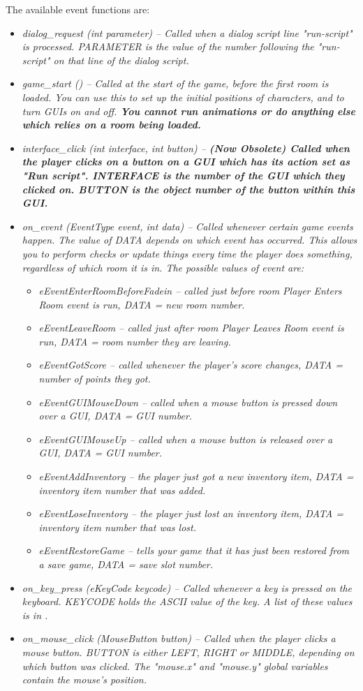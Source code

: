 The available event functions are:
\begin{itemize}
\item \it{dialog_request (int parameter)} -- Called when a dialog script line
  "run-script" is processed. PARAMETER is
  the value of the number following the "run-script" on that line of the
  dialog script.
\item \it{game_start ()} -- Called at the start of the game, before the first
  room is loaded. You can
  use this to set up the initial positions of characters, and to turn
  GUIs on and off. \bf{You cannot run animations or do anything else
  which relies on a room being loaded}.
\item \it{interface_click (int interface, int button)} -- \bf{(Now Obsolete)}
  Called when the player clicks on a button on a GUI which has its
  action set as "Run script". INTERFACE is the number of the GUI which they
  clicked on. BUTTON is the object number of the button within this GUI.
\item \it{on_event (EventType event, int data)} -- Called whenever certain game
  events happen. The value of DATA depends on
  which event has occurred. This allows you to perform checks or update things
  every time the player does something, regardless of which room it is in.
  The possible values of event are:
  \begin{itemize}
  \item \it{eEventEnterRoomBeforeFadein} -- called just before room Player Enters Room event is run,
      DATA = new room number.
  \item \it{eEventLeaveRoom} -- called just after room Player Leaves Room event is run,
      DATA = room number they are leaving.
  \item \it{eEventGotScore} -- called whenever the player's score changes,
      DATA = number of points they got.
  \item \it{eEventGUIMouseDown} -- called when a mouse button is pressed down over a GUI,
      DATA = GUI number.
  \item \it{eEventGUIMouseUp} -- called when a mouse button is released over a GUI,
      DATA = GUI number.
  \item \it{eEventAddInventory} -- the player just got a new inventory item,
      DATA = inventory item number that was added.
  \item \it{eEventLoseInventory} -- the player just lost an inventory item,
      DATA = inventory item number that was lost.
  \item \it{eEventRestoreGame} -- tells your game that it has just been restored from a save game,
      DATA = save slot number.
  \end{itemize}
\item \it{on_key_press (eKeyCode keycode)} -- Called whenever a key is pressed
  on the keyboard. KEYCODE holds the ASCII
  value of the key. A list of these values is in .
\item \it{on_mouse_click (MouseButton button)} -- Called when the player clicks
  a mouse button. BUTTON is either LEFT,
  RIGHT or MIDDLE, depending on which button was clicked. The "mouse.x" and "mouse.y"
  global variables contain the mouse's position.


\end{itemize}
